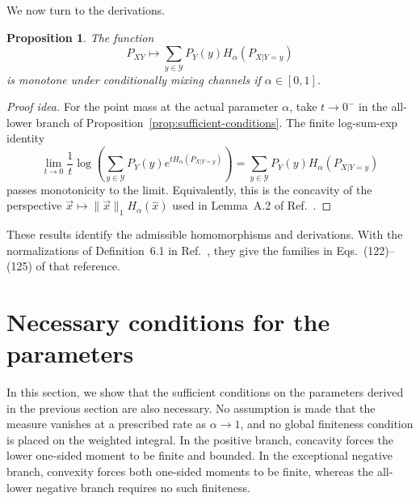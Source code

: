 \documentclass[11pt]{article}
\newtheorem{proposition}[theorem]{Proposition}
\theoremstyle{definition}
\newcommand{\Y}{\mathcal{Y}}
\begin{document}
We now turn to the derivations.

\begin{proposition}
\label{prop:sufficient-derivations}
The function
\begin{equation}
P_{XY}\longmapsto
\sum_{y\in\Y}P_Y(y)H_\alpha(P_{X|Y=y})
\end{equation}
is monotone under conditionally mixing channels if $\alpha\in[0,1]$.
\end{proposition}

\begin{proof}[Proof idea]
For the point mass at the actual parameter $\alpha$, take $t\to0^-$ in the
all-lower branch of Proposition~\ref{prop:sufficient-conditions}.  The finite
log-sum-exp identity
\begin{equation}
\lim_{t\to0}\frac1t\log\!\left(
\sum_{y\in\Y}P_Y(y)e^{tH_\alpha(P_{X|Y=y})}\right)
=\sum_{y\in\Y}P_Y(y)H_\alpha(P_{X|Y=y})
\end{equation}
passes monotonicity to the limit.  Equivalently, this is the concavity of the
perspective $\vec{x}\mapsto\|\vec{x}\|_1H_\alpha(\hat{x})$ used in Lemma~A.2
of Ref.~\cite{rubboli2026complete}.
\end{proof}

These results identify the admissible homomorphisms and derivations.  With the
normalizations of Definition~6.1 in Ref.~\cite{rubboli2026complete}, they give
the families in Eqs.~(122)--(125) of that reference.

\section{Necessary conditions for the parameters}
\label{sec:necessary-conditions-measures}

In this section, we show that the sufficient conditions on the parameters derived
in the previous section are also necessary.  No assumption is made that the
measure vanishes at a prescribed rate as $\alpha\to1$, and no global finiteness
condition is placed on the weighted integral.  In the positive branch, concavity
forces the lower one-sided moment to be finite and bounded.  In the exceptional
negative branch, convexity forces both one-sided moments to be finite, whereas
the all-lower negative branch requires no such finiteness.
\end{document}
